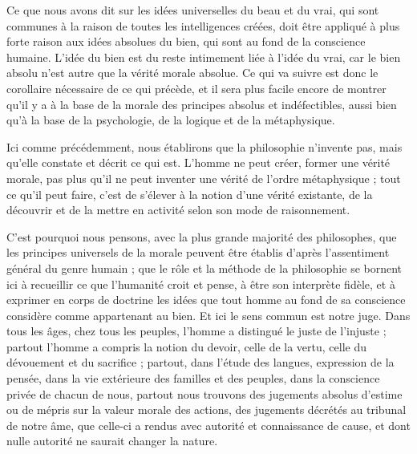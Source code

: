 \documentclass[a4paper, 11pt, oneside]{article}
\begin{document}
Ce que nous avons dit sur les idées universelles du beau et du vrai, qui sont communes à la raison de toutes les intelligences créées, doit être appliqué à plus forte raison aux idées absolues du bien, qui sont au fond de la conscience humaine. L'idée du bien est du reste intimement liée à l'idée du vrai, car le bien absolu n'est autre que la vérité morale absolue. Ce qui va suivre est donc le corollaire nécessaire de ce qui précède, et il sera plus facile encore de montrer qu'il y a à la base de la morale des principes absolus et indéfectibles, aussi bien qu'à la base de la psychologie, de la logique et de la métaphysique.

Ici comme précédemment, nous établirons que la philosophie n'invente pas, mais qu'elle constate et décrit ce qui est. L'homme ne peut créer, former une vérité morale, pas plus qu'il ne peut inventer une vérité de l'ordre métaphysique ; tout ce qu'il peut faire, c'est de s'élever à la notion d'une vérité existante, de la découvrir et de la mettre en activité selon son mode de raisonnement.

C'est pourquoi nous pensons, avec la plus grande majorité des philosophes, que les principes universels de la morale peuvent être établis d'après l'assentiment général du genre humain ; que le rôle et la méthode de la philosophie se bornent ici à recueillir ce que l'humanité croit et pense, à être son interprète fidèle, et à exprimer en corps de doctrine les idées que tout homme au fond de sa conscience considère comme appartenant au bien. Et ici le sens commun est notre juge. Dans tous les âges, chez tous les peuples, l'homme a distingué le juste de l'injuste ; partout l'homme a compris la notion du devoir, celle de la vertu, celle du dévouement et du sacrifice ; partout, dans l'étude des langues, expression de la pensée, dans la vie extérieure des familles et des peuples, dans la conscience privée de chacun de nous, partout nous trouvons des jugements absolus d'estime ou de mépris sur la valeur morale des actions, des jugements décrétés au tribunal de notre âme, que celle-ci a rendus avec autorité et connaissance de cause, et dont nulle autorité ne saurait changer la nature.
\end{document}
